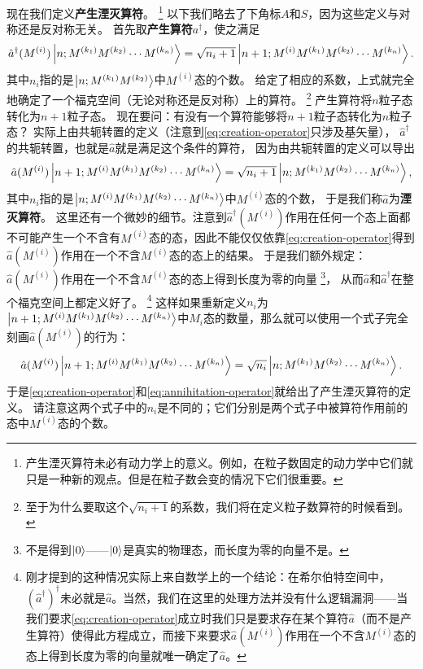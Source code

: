 \documentclass[hyperref, UTF8, a4paper]{ctexart}
\begin{document}
现在我们定义\textbf{产生湮灭算符}。%
\footnote{产生湮灭算符未必有动力学上的意义。例如，在粒子数固定的动力学中它们就只是一种新的观点。但是在粒子数会变的情况下它们很重要。}%
以下我们略去了下角标$A$和$S$，因为这些定义与对称还是反对称无关。
首先取\textbf{产生算符}$a^\dagger$，使之满足
\begin{equation}
    \hat{a}^\dagger (M^{(i)}) \ket{n; M^{(k_1)} M^{(k_2)} \cdots M^{(k_n)}} = \sqrt{n_i + 1} \ket{n+1; M^{(i)} M^{(k_1)} M^{(k_2)} \cdots M^{(k_n)}}.
    \label{eq:creation-operator}
\end{equation}
其中${n_i}$指的是$\ket{n; M^{(k_1)} M^{(k_2)}}$中$M^{(i)}$态的个数。
给定了相应的系数，上式就完全地确定了一个福克空间（无论对称还是反对称）上的算符。%
\footnote{至于为什么要取这个$\sqrt{n_i + 1}$的系数，我们将在定义粒子数算符的时候看到。}
产生算符将$n$粒子态转化为$n+1$粒子态。
现在要问：有没有一个算符能够将$n+1$粒子态转化为$n$粒子态？
实际上由共轭转置的定义（注意到\eqref{eq:creation-operator}只涉及基矢量），
$\hat{a}^\dagger$的共轭转置，也就是$\hat{a}$就是满足这个条件的算符，
因为由共轭转置的定义可以导出
\[
    \hat{a} (M^{(i)}) \ket{n+1; M^{(i)} M^{(k_1)} M^{(k_2)} \cdots M^{(k_n)}} = \sqrt{n_i + 1} \ket{n; M^{(k_1)} M^{(k_2)} \cdots M^{(k_n)}},
\]
其中$n_i$指的是$\ket{n;M^{(i)} M^{(k_1)} M^{(k_2)} \cdots M^{(k_n)}}$中$M^{(i)}$态的个数，
于是我们称$\hat{a}$为\textbf{湮灭算符}。
这里还有一个微妙的细节。注意到$\hat{a}^\dagger(M^{(i)})$作用在任何一个态上面都不可能产生一个不含有$M^{(i)}$态的态，因此不能仅仅依靠\eqref{eq:creation-operator}得到$\hat{a}(M^{(i)})$作用在一个不含$M^{(i)}$态的态上的结果。
于是我们额外规定：$\hat{a}(M^{(i)})$作用在一个不含$M^{(i)}$态的态上得到长度为零的向量%
\footnote{不是得到$\ket{0}$——$\ket{0}$是真实的物理态，而长度为零的向量不是。}，
从而$\hat{a}$和$\hat{a}^\dagger$在整个福克空间上都定义好了。%
\footnote{刚才提到的这种情况实际上来自数学上的一个结论：在希尔伯特空间中，$(\hat{a}^\dagger)^\dagger$未必就是$\hat{a}$。当然，我们在这里的处理方法并没有什么逻辑漏洞——当我们要求\eqref{eq:creation-operator}成立时我们只是要求存在某个算符$\hat{a}$（而不是产生算符）使得此方程成立，而接下来要求$\hat{a}(M^{(i)})$作用在一个不含$M^{(i)}$态的态上得到长度为零的向量就唯一确定了$\hat{a}$。}
这样如果重新定义$n_i$为$\ket{n+1; M^{(i)} M^{(k_1)} M^{(k_2)} \cdots M^{(k_n)}}$中$M_i$态的数量，那么就可以使用一个式子完全刻画$\hat{a}(M^{(i)})$的行为：
\begin{equation}
    \hat{a} (M^{(i)}) \ket{n+1; M^{(i)} M^{(k_1)} M^{(k_2)} \cdots M^{(k_n)}} = \sqrt{n_i} \ket{n; M^{(k_1)} M^{(k_2)} \cdots M^{(k_n)}}.
    \label{eq:annihitation-operator}
\end{equation}
于是\eqref{eq:creation-operator}和\eqref{eq:annihitation-operator}就给出了产生湮灭算符的定义。
请注意这两个式子中的$n_i$是不同的；它们分别是两个式子中被算符作用前的态中$M^{(i)}$态的个数。
\end{document}
